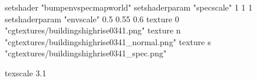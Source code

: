 setshader "bumpenvspecmapworld"
setshaderparam "specscale" 1 1 1
setshaderparam "envscale"  0.5 0.55 0.6
   texture 0 "cgtextures/buildingshighrise0341.png"
   texture n "cgtextures/buildingshighrise0341_normal.png"
   texture s "cgtextures/buildingshighrise0341_spec.png"

texscale 3.1